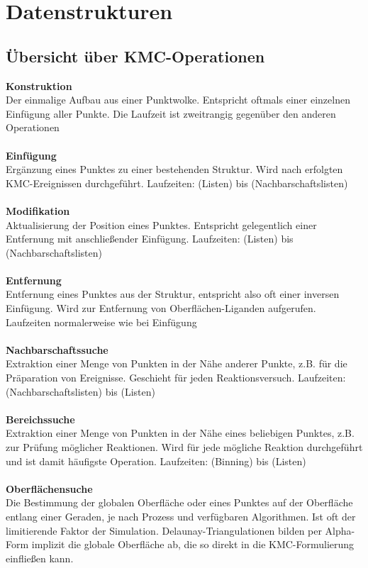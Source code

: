 \chapter{Datenstrukturen}
\label{appendix_datastructures}

\section{Übersicht über KMC-Operationen}
\label{dataops}


\textbf{Konstruktion} \\
Der einmalige Aufbau aus einer Punktwolke.
Entspricht oftmals einer einzelnen Einfügung aller Punkte.
Die Laufzeit ist zweitrangig gegenüber den anderen Operationen
\\\\
\textbf{Einfügung} \\
Ergänzung eines Punktes zu einer bestehenden Struktur.
Wird nach erfolgten KMC-Ereignissen durchgeführt.
Laufzeiten:  (Listen) bis  (Nachbarschaftslisten)
\\\\
\textbf{Modifikation} \\
Aktualisierung der Position eines Punktes.
Entspricht gelegentlich einer Entfernung mit anschließender Einfügung.
Laufzeiten:  (Listen) bis  (Nachbarschaftslisten)
\\\\
\textbf{Entfernung} \\
Entfernung eines Punktes aus der Struktur, entspricht also oft einer inversen Einfügung.
Wird zur Entfernung von Oberflächen-Liganden aufgerufen.
Laufzeiten normalerweise wie bei Einfügung
\\\\
\textbf{Nachbarschaftssuche} \\
Extraktion einer Menge von Punkten in der Nähe anderer Punkte, z.B. für die Präparation von Ereignisse.
Geschieht für jeden Reaktionsversuch.
Laufzeiten:  (Nachbarschaftslisten) bis  (Listen)
\\\\
\textbf{Bereichssuche} \\
Extraktion einer Menge von Punkten in der Nähe eines beliebigen Punktes, z.B. zur Prüfung möglicher Reaktionen.
Wird für jede mögliche Reaktion durchgeführt und ist damit häufigste Operation.
Laufzeiten:  (Binning) bis  (Listen)
\\\\
\textbf{Oberflächensuche} \\
Die Bestimmung der globalen Oberfläche oder eines Punktes auf der Oberfläche entlang einer Geraden, je nach Prozess und verfügbaren Algorithmen.
Ist oft der limitierende Faktor der Simulation.
Delaunay-Triangulationen bilden per Alpha-Form implizit die globale Oberfläche ab, die so direkt in die KMC-Formulierung einfließen kann.


